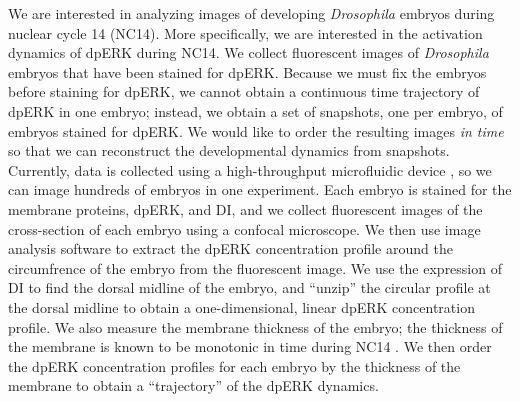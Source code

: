 \documentclass[10pt]{article}
\begin{document}
We are interested in analyzing images of developing {\em Drosophila} embryos during nuclear cycle 14 (NC14).
%
More specifically, we are interested in the activation dynamics of dpERK during NC14.
%
We collect fluorescent images of {\em Drosophila} embryos that have been stained for dpERK. 
%
Because we must fix the embryos before staining for dpERK, we cannot obtain a continuous time trajectory of dpERK in one embryo; instead, we obtain a set of snapshots, one per embryo, of embryos stained for dpERK. 
% 
We would like to order the resulting images {\em in time} so that we can reconstruct the developmental dynamics from snapshots. 
%
%
Currently, data is collected using a high-throughput microfluidic device \cite{chung2010microfluidic}, so we can image hundreds of embryos in one experiment.
%
Each embryo is stained for the membrane proteins, dpERK, and DI, and we collect fluorescent images of the cross-section of each embryo using a confocal microscope.
%
We then use image analysis software to extract the dpERK concentration profile around the circumfrence of the embryo from the fluorescent image.
%
We use the expression of DI to find the dorsal midline of the embryo, and ``unzip'' the circular profile at the dorsal midline to obtain a one-dimensional, linear dpERK concentration profile.
%
We also measure the membrane thickness of the embryo; the thickness of the membrane is known to be monotonic in time during NC14 \cite{lim2013kinetics, lecuit2002slam}. 
%
We then order the dpERK concentration profiles for each embryo by the thickness of the membrane to obtain a ``trajectory'' of the dpERK dynamics.
\end{document}
